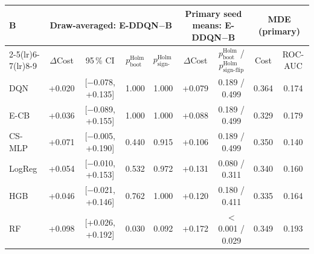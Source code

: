\begin{tabular}{lcccccccc}
\toprule
B & \multicolumn{4}{c}{Draw-averaged: E-DDQN$-$B} & \multicolumn{2}{c}{Primary seed means: E-DDQN$-$B} & \multicolumn{2}{c}{MDE (primary)} \\
\cmidrule(lr){2-5}\cmidrule(lr){6-7}\cmidrule(lr){8-9}
 & $\Delta$Cost & 95\,\% CI & $p_{\text{boot}}^{\text{Holm}}$ & $p_{\text{sign-flip}}^{\text{Holm}}$ & $\Delta$Cost & $p_{\text{boot}}^{\text{Holm}}$ / $p_{\text{sign-flip}}^{\text{Holm}}$ & Cost & ROC-AUC \\
\midrule
DQN & +0.020 & [$-$0.078, +0.135] & 1.000 & 1.000 & +0.079 & 0.189 / 0.499 & 0.364 & 0.174 \\
E-CB & +0.036 & [$-$0.089, +0.155] & 1.000 & 1.000 & +0.088 & 0.189 / 0.499 & 0.329 & 0.179 \\
CS-MLP & +0.071 & [$-$0.005, +0.190] & 0.440 & 0.915 & +0.106 & 0.189 / 0.499 & 0.350 & 0.140 \\
LogReg & +0.054 & [$-$0.010, +0.153] & 0.532 & 0.972 & +0.131 & 0.080 / 0.311 & 0.340 & 0.160 \\
HGB & +0.046 & [$-$0.021, +0.146] & 0.762 & 1.000 & +0.120 & 0.180 / 0.411 & 0.335 & 0.164 \\
RF & +0.098 & [+0.026, +0.192] & 0.030 & 0.092 & +0.172 & $<$0.001 / 0.029 & 0.349 & 0.193 \\
\bottomrule
\end{tabular}
